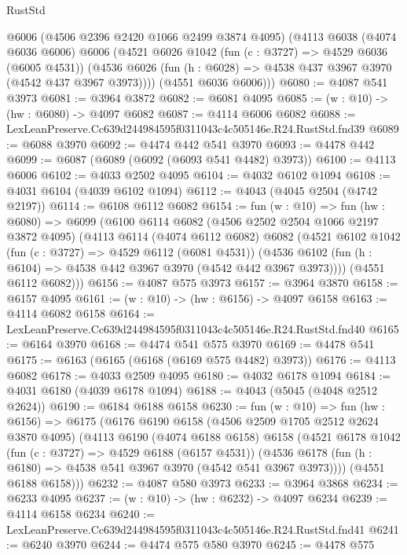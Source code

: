 \begin{lexlean}{RustStd}
\begin{coremodule}
      @6006
      (@4506 @2396 @2420 @1066 @2499 @3874 @4095)
      (@4113
        @6038
        (@4074 @6036 @6006)
        @6006
        (@4521
          @6026
          @1042
          (fun (c : @3727) => @4529 @6036 (@6005 @4531))
          (@4536 @6026 (fun (h : @6028) => @4538 @437 @3967 @3970 (@4542 @437 @3967 @3973))))
        (@4551 @6036 @6006)))
@6080 := @4087 @541 @3973
@6081 := @3964 @3872
@6082 := @6081 @4095
@6085 := (w : @10) -> (hw : @6080) -> @4097 @6082
@6087 := @4114 @6006 @6082
@6088 := LexLeanPreserve.Cc639d244984595f0311043c4c505146e.R24.RustStd.fnd39
@6089 := @6088 @3970
@6092 := @4474 @442 @541 @3970
@6093 := @4478 @442
@6099 := @6087 (@6089 (@6092 (@6093 @541 @4482) @3973))
@6100 := @4113 @6006
@6102 := @4033 @2502 @4095
@6104 := @4032 @6102 @1094
@6108 := @4031 @6104 (@4039 @6102 @1094)
@6112 := @4043 (@4045 @2504 (@4742 @2197))
@6114 := @6108 @6112 @6082
@6154 := fun (w : @10) =>
  fun (hw : @6080) =>
  @6099
    (@6100
      @6114
      @6082
      (@4506 @2502 @2504 @1066 @2197 @3872 @4095)
      (@4113
        @6114
        (@4074 @6112 @6082)
        @6082
        (@4521
          @6102
          @1042
          (fun (c : @3727) => @4529 @6112 (@6081 @4531))
          (@4536 @6102 (fun (h : @6104) => @4538 @442 @3967 @3970 (@4542 @442 @3967 @3973))))
        (@4551 @6112 @6082)))
@6156 := @4087 @575 @3973
@6157 := @3964 @3870
@6158 := @6157 @4095
@6161 := (w : @10) -> (hw : @6156) -> @4097 @6158
@6163 := @4114 @6082 @6158
@6164 := LexLeanPreserve.Cc639d244984595f0311043c4c505146e.R24.RustStd.fnd40
@6165 := @6164 @3970
@6168 := @4474 @541 @575 @3970
@6169 := @4478 @541
@6175 := @6163 (@6165 (@6168 (@6169 @575 @4482) @3973))
@6176 := @4113 @6082
@6178 := @4033 @2509 @4095
@6180 := @4032 @6178 @1094
@6184 := @4031 @6180 (@4039 @6178 @1094)
@6188 := @4043 (@5045 (@4048 @2512 @2624))
@6190 := @6184 @6188 @6158
@6230 := fun (w : @10) =>
  fun (hw : @6156) =>
  @6175
    (@6176
      @6190
      @6158
      (@4506 @2509 @1705 @2512 @2624 @3870 @4095)
      (@4113
        @6190
        (@4074 @6188 @6158)
        @6158
        (@4521
          @6178
          @1042
          (fun (c : @3727) => @4529 @6188 (@6157 @4531))
          (@4536 @6178 (fun (h : @6180) => @4538 @541 @3967 @3970 (@4542 @541 @3967 @3973))))
        (@4551 @6188 @6158)))
@6232 := @4087 @580 @3973
@6233 := @3964 @3868
@6234 := @6233 @4095
@6237 := (w : @10) -> (hw : @6232) -> @4097 @6234
@6239 := @4114 @6158 @6234
@6240 := LexLeanPreserve.Cc639d244984595f0311043c4c505146e.R24.RustStd.fnd41
@6241 := @6240 @3970
@6244 := @4474 @575 @580 @3970
@6245 := @4478 @575

\end{coremodule}
\end{lexlean}
